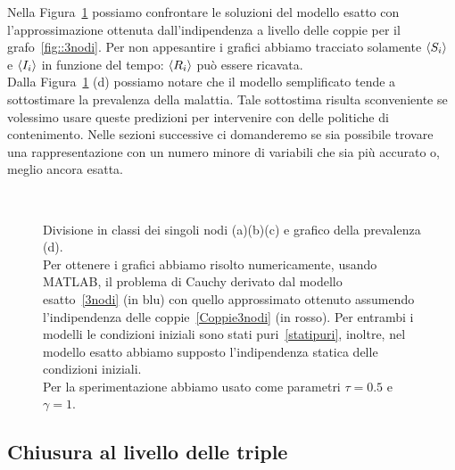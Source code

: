 Nella Figura~\ref{fig::coppie3nodi} possiamo confrontare le soluzioni del modello esatto con l'approssimazione ottenuta  dall'indipendenza a livello delle coppie per il grafo~\ref{fig::3nodi}. Per non appesantire i grafici abbiamo tracciato solamente  $\langle S_i \rangle$ e $\langle I_i \rangle$ in funzione  del tempo: $\langle  R_i \rangle$ pu\`o essere ricavata.\\
Dalla Figura~\ref{fig::coppie3nodi} (d) possiamo notare che il modello semplificato tende a sottostimare la prevalenza della malattia. Tale sottostima risulta sconveniente se volessimo usare queste  predizioni per intervenire con delle politiche di contenimento. Nelle sezioni successive ci domanderemo se sia possibile trovare una rappresentazione con un numero minore di variabili che sia pi\`u accurato o, meglio ancora esatta.  \begin{figure}[!h]

\centering
\subfloat[][Nodo 1]
{\resizebox{0.45\textwidth}{!}{}}
 \quad 
\subfloat[][Nodo 2]
{\resizebox{0.45\textwidth}{!}{ }}
\\
\subfloat[][Nodo 3]
{\resizebox{0.45\textwidth}{!}
{}
}
\quad
\subfloat[][Prevalenza]
{\resizebox{0.45\textwidth}{!}
{}
}
\caption[Confronto tra modello esatto e chiuso alle coppie per~\ref{fig::3nodi}]{Divisione in classi dei  singoli nodi (a)(b)(c) e grafico della prevalenza (d).\\ Per ottenere i grafici abbiamo risolto numericamente,  usando MATLAB,  il problema di Cauchy derivato dal modello esatto~\eqref{3nodi} (in blu) con quello approssimato  ottenuto   assumendo l'indipendenza delle coppie~\eqref{Coppie3nodi} (in rosso).  Per entrambi i modelli le condizioni iniziali sono stati puri~\eqref{statipuri},  inoltre,  nel modello esatto abbiamo supposto l'indipendenza statica delle condizioni iniziali.\\
Per la sperimentazione abbiamo usato come parametri $\tau=0.5$ e $\gamma=1$.}
\label{fig::coppie3nodi}
\end{figure}
\subsection{Chiusura al livello delle triple}

\lipsum[6-10]

